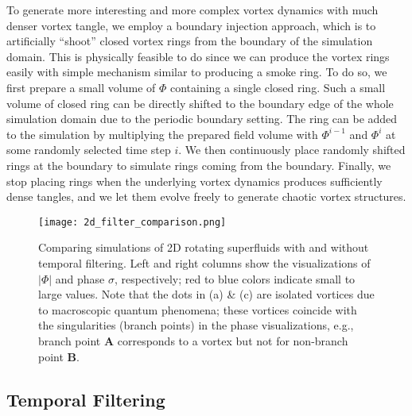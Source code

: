 \documentclass[10pt,journal,compsoc,twoside]{IEEEtran}
\begin{document}
	To generate more interesting and more complex vortex dynamics with much denser vortex tangle, 
	we employ a boundary injection approach, which is to artificially ``shoot'' closed vortex rings from the boundary of the simulation domain.
	This is physically feasible to do since we can produce the vortex rings easily with simple mechanism similar to producing a smoke ring.
	To do so, we first prepare a small volume of $\Phi$ containing a single closed ring.
	Such a small volume of closed ring can be directly shifted to the boundary edge of the whole simulation domain due to the periodic boundary setting. 
	The ring can be added to the simulation by multiplying the prepared field volume with $\Phi^{i-1}$ and $\Phi^{i}$ at some randomly selected time step $i$. 
	We then continuously place randomly shifted rings at the boundary to simulate rings coming from the boundary. 
	Finally, we stop placing rings when the underlying vortex dynamics produces sufficiently dense tangles, and we let them evolve freely to generate chaotic vortex structures.
	
	\begin{figure}[!t]
		\centering
		\texttt{[image: 2d\_filter\_comparison.png]}
		\caption{Comparing simulations of 2D rotating superfluids with and without temporal filtering.
			Left and right columns show the visualizations of $|\Phi|$ and phase $\sigma$, respectively; red to blue colors indicate small to large values.
			Note that the dots in (a) \& (c) are isolated vortices due to macroscopic quantum phenomena; these vortices coincide with the singularities (branch points) in the phase visualizations, e.g., branch point \textbf{A} corresponds to a vortex but not for non-branch point \textbf{B}.}
		\label{fig:2d_filter_comparison}
	\end{figure}
	
	

	\subsection{Temporal Filtering}
	\label{sec:tempral_filtering}
	
\end{document}
